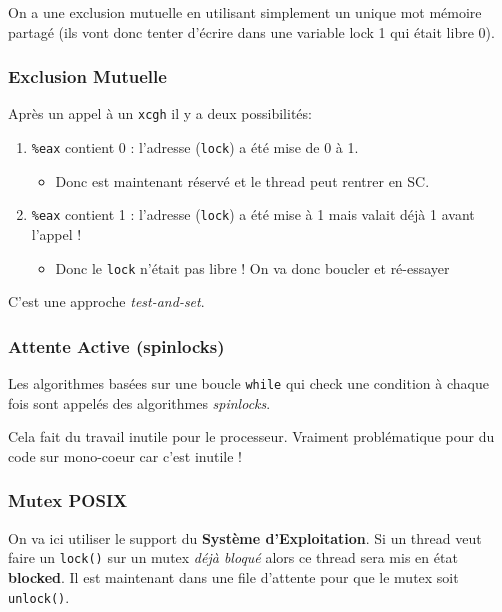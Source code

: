 On a une exclusion mutuelle en utilisant simplement un unique mot
mémoire partagé (ils vont donc tenter d'écrire dans une variable lock 1
qui était libre 0).

\subsubsection{Exclusion Mutuelle}\label{exclusion-mutuelle}

Après un appel à un \texttt{xcgh} il y a deux possibilités:

\begin{enumerate}
\def\labelenumi{\arabic{enumi}.}
\tightlist
\item
  \texttt{\%eax} contient 0 : l'adresse (\texttt{lock}) a été mise de 0
  à 1.

  \begin{itemize}
  \tightlist
  \item
    Donc est maintenant réservé et le thread peut rentrer en SC.
  \end{itemize}
\item
  \texttt{\%eax} contient 1 : l'adresse (\texttt{lock}) a été mise à 1
  mais valait déjà 1 avant l'appel !

  \begin{itemize}
  \tightlist
  \item
    Donc le \texttt{lock} n'était pas libre ! On va donc boucler et
    ré-essayer
  \end{itemize}
\end{enumerate}

C'est une approche \emph{test-and-set}.

\subsubsection{Attente Active
(spinlocks)}\label{attente-active-spinlocks}

Les algorithmes basées sur une boucle \texttt{while} qui check une
condition à chaque fois sont appelés des algorithmes \emph{spinlocks}.

Cela fait du travail inutile pour le processeur. Vraiment problématique
pour du code sur mono-coeur car c'est inutile !

\subsubsection{Mutex POSIX}\label{mutex-posix}

On va ici utiliser le support du \textbf{Système d'Exploitation}. Si un
thread veut faire un \texttt{lock()} sur un mutex \emph{déjà bloqué}
alors ce thread sera mis en état \textbf{blocked}. Il est maintenant
dans une file d'attente pour que le mutex soit \texttt{unlock()}.

